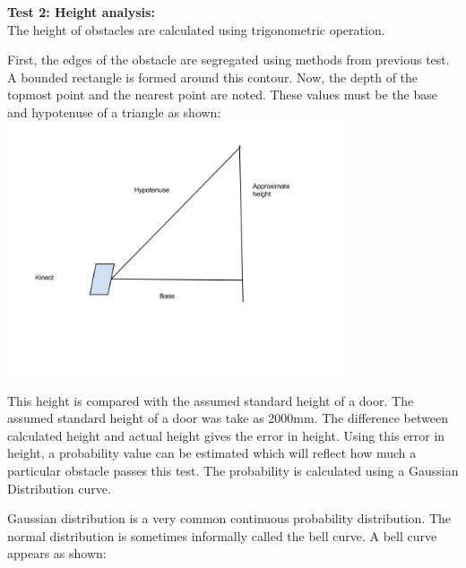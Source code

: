 \documentclass{report}
\begin{document}
\textbf{Test 2: Height analysis:} \\
The height of obstacles are calculated using trigonometric operation.

First, the edges of the obstacle are segregated using methods from previous test. 
A bounded rectangle is formed around this contour. Now, the depth of the topmost point and the nearest 
point are noted. These values must be the base and hypotenuse of a triangle as shown: \\

\includegraphics[width = 10cm]{pythagoras.jpg}

This height is compared with the assumed standard height of a door. The assumed standard height of a door was take as 2000mm. 
The difference between calculated height and actual height gives the error in height. Using this error in height, 
a probability value can be estimated which will reflect how much a particular obstacle passes this test. 
The probability is calculated using a Gaussian Distribution curve. \\
\pagebreak

Gaussian distribution is a very common continuous probability distribution. The normal distribution is sometimes informally called the bell curve.
A bell curve appears as shown:\\
\end{document}
